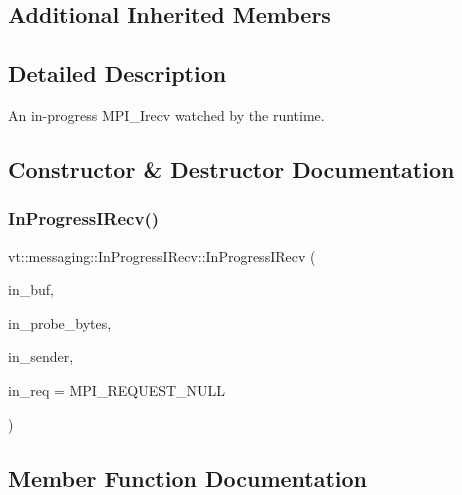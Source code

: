 \subsection*{Additional Inherited Members}


\subsection{Detailed Description}
An in-\/progress M\+P\+I\+\_\+\+Irecv watched by the runtime. 

\subsection{Constructor \& Destructor Documentation}
\mbox{\label{structvt_1_1messaging_1_1_in_progress_i_recv_a1206e5cae68fd12bb821dc2c4c8172d4}} 
\subsubsection{\texorpdfstring{In\+Progress\+I\+Recv()}{InProgressIRecv()}}
{\footnotesize\ttfamily vt\+::messaging\+::\+In\+Progress\+I\+Recv\+::\+In\+Progress\+I\+Recv (\begin{DoxyParamCaption}\item[{std\+::byte $\ast$}]{in\+\_\+buf,  }\item[{\hyperlink{namespacevt_a408e86a8c7c89309b52907dc5a513924}{Msg\+Size\+Type}}]{in\+\_\+probe\+\_\+bytes,  }\item[{\hyperlink{namespacevt_a866da9d0efc19c0a1ce79e9e492f47e2}{Node\+Type}}]{in\+\_\+sender,  }\item[{M\+P\+I\+\_\+\+Request}]{in\+\_\+req = {\ttfamily MPI\+\_\+REQUEST\+\_\+NULL} }\end{DoxyParamCaption})\hspace{0.3cm}{\ttfamily [inline]}}



\subsection{Member Function Documentation}
\mbox{\label{structvt_1_1messaging_1_1_in_progress_i_recv_ac5cabd7a87cc7c75d6870a2597c50a8c}} 
